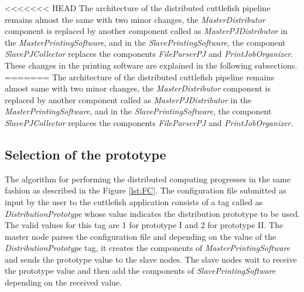 <<<<<<< HEAD
The architecture of the distributed cuttlefish pipeline remains almost the same with two minor changes, the \textit{MasterDistributor} component is replaced by another component called as \textit{MasterPJDistributor} in the \textit{MasterPrintingSoftware}, and in the \textit{SlavePrintingSoftware}, the component \textit{SlavePJCollector} replaces the components \textit{FileParserPJ} and \textit{PrintJobOrganizer}. These changes in the printing software are explained in the following subsections. \newline 
=======
The architecture of the distributed cuttlefish pipeline remains almost same with two minor changes, the \textit{MasterDistributor} component is replaced by another component called as \textit{MasterPJDistributor} in the \textit{MasterPrintingSoftware}, and in the \textit{SlavePrintingSoftware}, the component \textit{SlavePJCollector} replaces the components \textit{FileParserPJ} and \textit{PrintJobOrganizer}.\newline 

\subsection{Selection of the prototype}

The algorithm for performing the distributed computing progresses in the same fashion as described in the Figure \ref{lst:FC}. The configuration file submitted as input by the user to the cuttlefish application consists of a tag called as \textit{DistributionPrototype} whose value indicates the distribution prototype to be used. The valid values for this tag are 1 for prototype I and 2 for prototype II. The master node parses the configuration file and depending on the value of the \textit{DistributionPrototype} tag, it creates the components of \textit{MasterPrintingSoftware} and sends the prototype value to the slave nodes. The slave nodes wait to receive the prototype value and then add the components of \textit{SlavePrintingSoftware} depending on the received value. \newline

